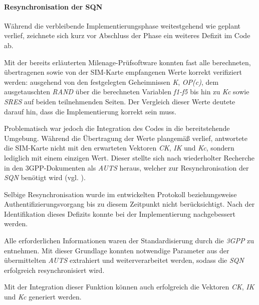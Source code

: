 		\paragraph{Resynchronisation der SQN} Während die verbleibende
		Implementierungsphase weitestgehend wie geplant verlief, zeichnete
		sich kurz vor Abschluss der Phase ein weiteres Defizit im Code ab.

		Mit der bereits erläuterten Milenage-Prüfsoftware konnten fast
		alle berechneten, über\-tragenen sowie von der SIM-Karte empfangenen
		Werte korrekt verifiziert werden: ausgehend von den festgelegten
		Geheimnissen \textit{K}, \textit{OP(c)}, dem ausgetauschten \textit{RAND}
		über die berechneten Variablen \textit{f1-f5} bis hin zu \textit{Kc} sowie
		\textit{SRES} auf beiden teilnehmenden Seiten.
		Der Vergleich dieser Werte deutete darauf hin, dass die Implementierung
		korrekt sein muss.

		Problematisch war jedoch die Integration des Codes in die bereitstehende
		Umgebung. Während die Übertragung der Werte plangemäß verlief, antwortete
		die SIM-Karte nicht mit den erwarteten Vektoren \textit{CK}, \textit{IK}
		und \textit{Kc}, sondern lediglich mit einem einzigen Wert. Dieser
		stellte sich nach wiederholter Recherche in den 3GPP-Dokumenten als
		\textit{AUTS} heraus, welcher zur Resynchronisation der \textit{SQN}
		benötigt wird (vgl. ).

		Selbige Resynchronisation wurde im entwickelten
		Protokoll beziehungsweise Authentifizierungsvorgang bis zu diesem Zeitpunkt
		nicht berücksichtigt. Nach der Identifikation dieses Defizits
		konnte bei der Implementierung nachgebessert werden.

		Alle erforderlichen Informationen waren der Standardisierung
		durch die \textit{3GPP} zu entnehmen. Mit dieser Grundlage konnten
		notwendige Parameter aus der übermittelten \textit{AUTS} extrahiert
		und weiterverarbeitet werden, sodass die \textit{SQN} erfolgreich
		resynchronisiert wird. 

		Mit der Integration dieser Funktion können auch erfolgreich die
		Vektoren \textit{CK}, \textit{IK} und \textit{Kc} generiert werden.

\clearpage